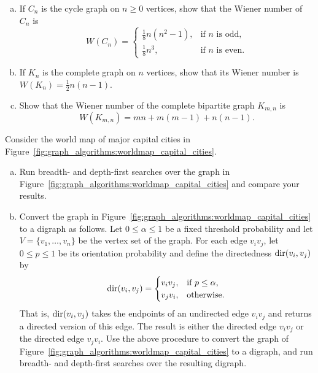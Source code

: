 \begin{problem}
\begin{enumerate}[(a)]
  \item If $C_n$ is the cycle graph on $n \geq 0$ vertices, show that
    the Wiener number of $C_n$ is
    \[
    W(C_n)
    =
    \begin{cases}
    \frac{1}{8} n(n^2 - 1), & \text{if $n$ is odd,} \\
    \frac{1}{8} n^3, & \text{if $n$ is even.}
    \end{cases}
    \]

  \item If $K_n$ is the complete graph on $n$ vertices, show that its
    Wiener number is $W(K_n) = \frac{1}{2} n(n - 1)$.

  \item Show that the Wiener number of the complete bipartite graph
    $K_{m,n}$ is
    \[
    W(K_{m,n}) = mn + m(m - 1) + n(n - 1).
    \]
  \end{enumerate}

\item Consider the world map of major capital cities in
  Figure~\ref{fig:graph_algorithms:worldmap_capital_cities}.
  \begin{enumerate}[(a)]
  \item Run breadth- and
    depth-first searches over the graph in
    Figure~\ref{fig:graph_algorithms:worldmap_capital_cities} and
    compare your results.

  \item Convert the graph in
    Figure~\ref{fig:graph_algorithms:worldmap_capital_cities} to a
    digraph as follows. Let $0 \leq \alpha \leq 1$ be a fixed
    threshold probability and let
    $V = \{v_1, \dots, v_n\}$ be the vertex set of the graph. For each
    edge $v_i v_j$, let $0 \leq p \leq 1$ be its
    orientation probability and define
    the directedness $\operatorname*{dir}(v_i, v_j)$\index{$\dir$} by
    \[
    \operatorname*{dir}(v_i, v_j)
    =
    \begin{cases}
    v_i v_j, & \text{if $p \leq \alpha$,} \\
    v_j v_i, & \text{otherwise.}
    \end{cases}
    \]
    That is, $\operatorname*{dir}(v_i, v_j)$ takes the endpoints of an undirected
    edge $v_i v_j$ and returns a directed version of this edge. The
    result is either the directed edge $v_i v_j$ or the directed edge
    $v_j v_i$. Use the above procedure to convert the graph of
    Figure~\ref{fig:graph_algorithms:worldmap_capital_cities} to a
    digraph, and run breadth- and
    depth-first searches over the resulting
    digraph.


\end{enumerate}
\end{problem}
